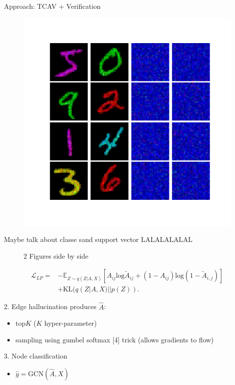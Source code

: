 \documentclass[final]{beamer}
\begin{document}
\begin{frame}[fragile]{}
\begin{textblock}{\colwidth}
\begin{paddedBlock}{Approach: TCAV + Verification}
\begin{figure}
    \centering
    \includegraphics[width=.2\textwidth]{img/cav_viz}
    \label{fig:big}
\end{figure}


\alert{Maybe talk about classe sand support vector}
LALALALALAL

\begin{figure}%
    \centering
    \qquad
    \caption{2 Figures side by side}%
    \label{fig:example}%
\end{figure}


\begin{align*}
\mathcal{L}_{LP}=&-\mathbb{E}_{Z\sim q(Z|A,X)}[A_{ij}\mathrm{log}\tilde{A}_{ij}+(1-A_{ij})\mathrm{log}(1-\tilde{A}_{i,j})]\\
&+\mathrm{KL}(q(Z|A,X)||p(Z)).
\end{align*}

\alert{2. Edge hallucination}
  produces $\hat{A}$:
  \begin{itemize}
    \item top$K$ ($K$ hyper-parameter)
    \item sampling using gumbel softmax [4] trick (allows gradients to flow)
  \end{itemize}
\alert{3. Node classification}
\begin{itemize}
	\item $\hat{y} = \mathrm{GCN}(\hat{A}, X)$
\end{itemize}


\end{paddedBlock}
\end{textblock}
\end{frame}
\end{document}
